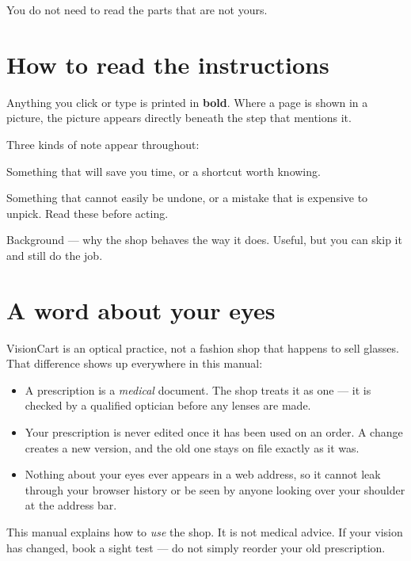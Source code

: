\documentclass[11pt,a4paper]{report}
\newcommand{\btn}[1]{\textbf{#1}}
\begin{document}
You do not need to read the parts that are not yours.

\section*{How to read the instructions}

Anything you click or type is printed in \btn{bold}. Where a page is
shown in a picture, the picture appears directly beneath the step that
mentions it.

Three kinds of note appear throughout:

\begin{tipbox}
Something that will save you time, or a shortcut worth knowing.
\end{tipbox}

\begin{warnbox}
Something that cannot easily be undone, or a mistake that is expensive
to unpick. Read these before acting.
\end{warnbox}

\begin{notebox}
Background --- why the shop behaves the way it does. Useful, but you can
skip it and still do the job.
\end{notebox}

\section*{A word about your eyes}

VisionCart is an optical practice, not a fashion shop that happens to
sell glasses. That difference shows up everywhere in this manual:

\begin{itemize}
  \item A prescription is a \emph{medical} document. The shop treats it
        as one --- it is checked by a qualified optician before any
        lenses are made.
  \item Your prescription is never edited once it has been used on an
        order. A change creates a new version, and the old one stays on
        file exactly as it was.
  \item Nothing about your eyes ever appears in a web address, so it
        cannot leak through your browser history or be seen by anyone
        looking over your shoulder at the address bar.
\end{itemize}

\begin{warnbox}
This manual explains how to \emph{use} the shop. It is not medical
advice. If your vision has changed, book a sight test --- do not simply
reorder your old prescription.
\end{warnbox}
\end{document}
